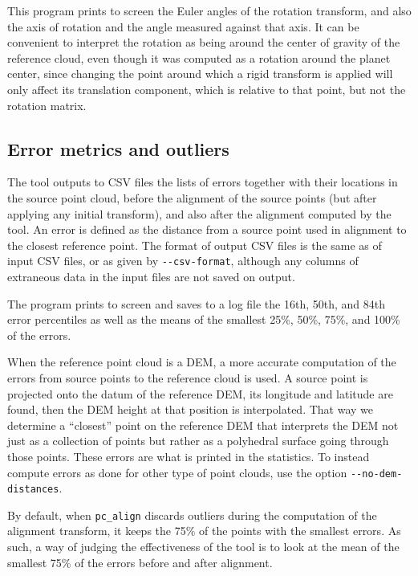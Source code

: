 This program prints to screen the Euler angles of the rotation
transform, and also the axis of rotation and the angle measured against that
axis. It can be convenient to interpret the rotation as being around the
center of gravity of the reference cloud, even though it was computed as
a rotation around the planet center, since changing the point around
which a rigid transform is applied will only affect its translation
component, which is relative to that point, but not the rotation matrix.

\subsection{Error metrics and outliers}

The tool outputs to CSV files the lists of errors together with their
locations in the source point cloud, before the alignment of the source
points (but after applying any initial transform), and also after the alignment
computed by the tool. An error is defined as the distance from a source
point used in alignment to the closest reference point. The format of
output CSV files is the same as of input CSV files, or as given by
\texttt{-\/-csv-format}, although any columns of extraneous data in the
input files are not saved on output.

The program prints to screen and saves to a log file the 16th, 50th, and
84th error percentiles as well as the means of the smallest 25\%, 50\%,
75\%, and 100\% of the errors.

When the reference point cloud is a DEM, a more accurate computation of
the errors from source points to the reference cloud is used. A source
point is projected onto the datum of the reference DEM, its longitude
and latitude are found, then the DEM height at that position is
interpolated.  That way we determine a ``closest'' point on the
reference DEM that interprets the DEM not just as a collection of points
but rather as a polyhedral surface going through those points. These
errors are what is printed in the statistics. To instead compute
errors as done for other type of point clouds, use the option
\texttt{-\/-no-dem-distances}.

By default, when \texttt{pc\_align} discards outliers during the
computation of the alignment transform, it keeps the 75\% of the points
with the smallest errors. As such, a way of judging the effectiveness of
the tool is to look at the mean of the smallest 75\% of the errors
before and after alignment.

